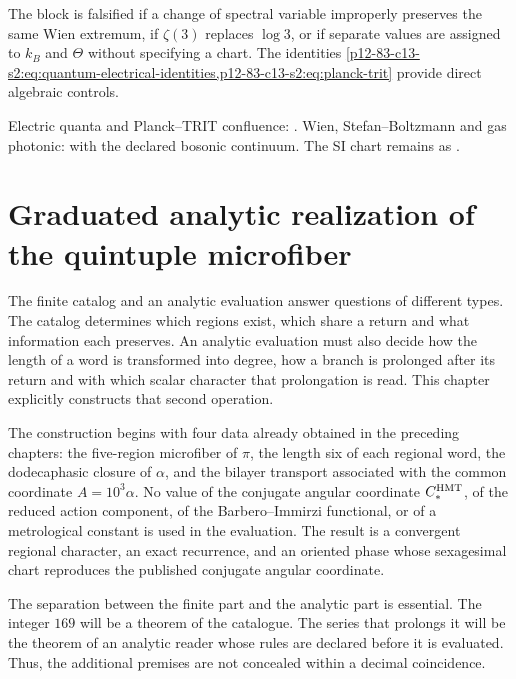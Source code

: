 \begin{falsifier}
The block is falsified if a change of spectral variable improperly preserves
the same Wien extremum, if \(\zeta(3)\) replaces
\(\log3\), or if separate values are assigned to \(k_B\) and \(\Theta\) without
specifying a chart. The identities
\cref{p12-83-c13-s2:eq:quantum-electrical-identities,p12-83-c13-s2:eq:planck-trit} provide direct
algebraic controls.
\end{falsifier}

\begin{statusbox}
Electric quanta and Planck--TRIT confluence: . Wien, Stefan--Boltzmann and gas photonic:  with the declared bosonic continuum. The SI chart remains as .
\end{statusbox}


\section{Graduated analytic realization of the quintuple microfiber}
\label{p12-83-c13-s3:chap:realizacion-analitica-contraangulo}

The finite catalog and an analytic evaluation answer questions of different
types. The catalog determines which regions exist, which share a
return and what information each preserves. An analytic evaluation must
also decide how the length of a word is transformed into degree, how
a branch is prolonged after its return and with which scalar character that
prolongation is read. This chapter explicitly constructs that second
operation.

The construction begins with four data already obtained in the preceding
chapters: the five-region microfiber of \(\pi\), the length six of
each regional word, the dodecaphasic closure of \(\alpha\), and the bilayer
transport associated with the common coordinate
\(A=10^3\alpha\). No value of the conjugate angular coordinate \(C_*^{\rm HMT}\), of the reduced action
component, of the Barbero--Immirzi functional, or of a metrological constant is
used in the evaluation. The result is a convergent regional character,
an exact recurrence, and an oriented phase whose sexagesimal chart reproduces
the published conjugate angular coordinate.

The separation between the finite part and the analytic part is essential. The
integer \(169\) will be a theorem of the catalogue. The series that prolongs it will be the
theorem of an analytic reader whose rules are declared before it is evaluated.
Thus, the additional premises are not concealed within a decimal
coincidence.

